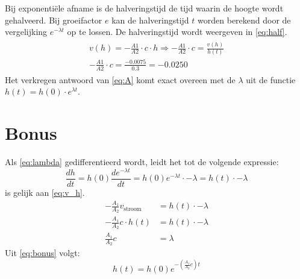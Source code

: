 \documentclass{scrartcl}
\begin{document}
Bij exponentiële afname is de halveringstijd de tijd waarin de hoogte wordt gehalveerd. Bij groeifactor $e$ kan de halveringstijd $t$ worden berekend door de vergelijking $e^{-\lambda t}$ op te lossen. De halveringstijd wordt weergeven in \cref{eq:half}.
\begin{align}\label{eq:A}
\begin{split}
v(h) = -\frac{A1}{A2} \cdot c \cdot h \Rightarrow -\frac{A1}{A2} \cdot c =\frac{v(h)}{h(t)}\\
-\frac{A1}{A2} \cdot c = \frac{-0.0075}{0.3} = -0.0250
\end{split}
\end{align}
Het verkregen antwoord van \cref{eq:A} komt exact overeen met de $\lambda$ uit de functie $h(t) = h(0)\cdot e^{\lambda t}$.

\newpage
\section{Bonus}
Als \cref{eq:lambda} gedifferentieerd wordt, leidt het tot de volgende expressie:
    \begin{equation}\label{eq:h_t_afgeleide_exp}
        \frac{dh}{dt} = h(0)\frac{de^{-\lambda t}}{dt} = h(0)e^{-\lambda t}\cdot-\lambda = h(t)\cdot-\lambda
    \end{equation}
     is gelijk aan \cref{eq:v_h}.
    \begin{equation}\label{eq:bonus}
        \begin{split}
            -\frac{A_1}{A_2}v_{\text{stroom}} &= h(t)\cdot-\lambda\\
            -\frac{A_1}{A_2}c\cdot h(t) &= h(t)\cdot-\lambda\\
            \frac{A_1}{A_2}c &= \lambda
        \end{split}
    \end{equation}
    Uit \cref{eq:bonus} volgt:
    \begin{equation*}
        h(t) = h(0)e^{-\left(\frac{A_1}{A_2}c\right)t}
    \end{equation*}
    
\end{document}
